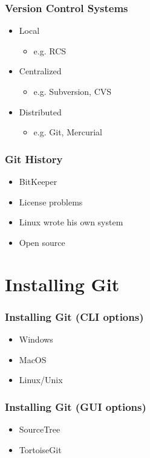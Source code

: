 \documentclass{git_course}
\begin{document}
\begin{frame}
\frametitle{Version Control Systems}
\begin{itemize}
    \item Local
    \begin{itemize}
        \item e.g. RCS
    \end{itemize}
    \item Centralized
    \begin{itemize}
        \item e.g. Subversion, CVS
    \end{itemize}
    \item Distributed
    \begin{itemize}
        \item e.g. Git, Mercurial
    \end{itemize}
\end{itemize}
\end{frame}

\begin{frame}
\frametitle{Git History}
\begin{itemize}
    \item BitKeeper
    \item License problems
    \item Linux wrote his own system
    \item Open source
\end{itemize}
\end{frame}


\section{Installing Git}

\begin{frame}
\frametitle{Installing Git (CLI options)}
\begin{itemize}
    \item Windows
    \item MacOS
    \item Linux/Unix
\end{itemize}
\end{frame}

\begin{frame}
\frametitle{Installing Git (GUI options)}
\begin{itemize}
    \item SourceTree
    \item TortoiseGit
\end{itemize}
\end{frame}
\end{document}
